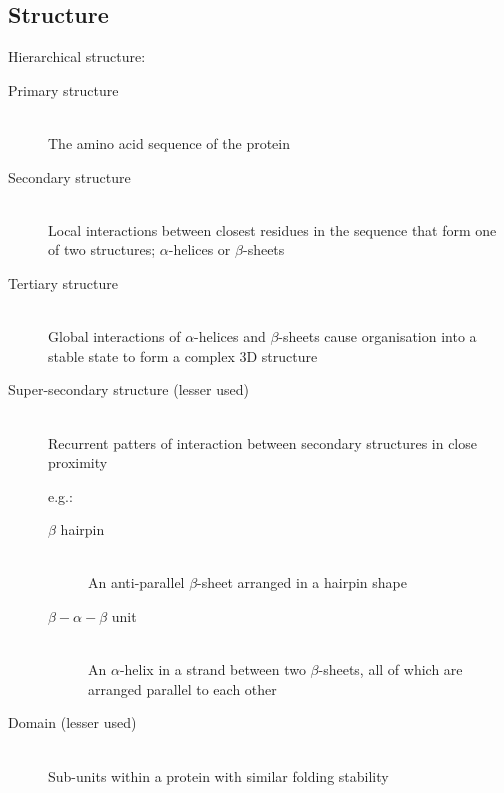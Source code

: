 \documentclass[a4paper]{article}
\begin{document}
\subsection{Structure}

Hierarchical structure:

\begin{description}
  \item[Primary structure] \hfill \\
    The amino acid sequence of the protein

  \item[Secondary structure] \hfill \\
    Local interactions between closest residues in the sequence that form one of
    two structures; $\alpha$-helices or $\beta$-sheets

  \item[Tertiary structure] \hfill \\
    Global interactions of $\alpha$-helices and $\beta$-sheets cause
    organisation into a stable state to form a complex 3D structure

  \item[Super-secondary structure (lesser used)] \hfill \\
    Recurrent patters of interaction between secondary structures in close
    proximity

    e.g.:
    \begin{description}
      \item[$\beta$ hairpin] \hfill \\
        An anti-parallel $\beta$-sheet arranged in a hairpin shape

      \item[$\beta-\alpha-\beta$ unit] \hfill \\
        An $\alpha$-helix in a strand between two $\beta$-sheets, all of which
        are arranged parallel to each other
    \end{description}

  \item[Domain (lesser used)] \hfill \\
    Sub-units within a protein with similar folding stability
\end{description}
\end{document}
